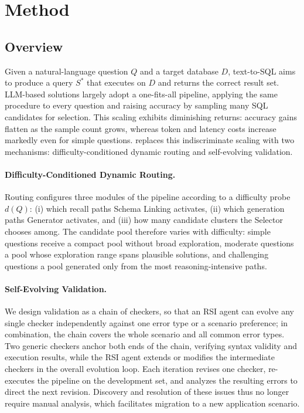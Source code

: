 \section{Method}
\label{sec:method}

\subsection{Overview}
\label{sec:overview}

Given a natural-language question $Q$ and a target database $D$, text-to-SQL aims
to produce a query $S^{*}$ that executes on $D$ and returns the correct result set.
LLM-based solutions largely adopt a one-fits-all pipeline, applying the same
procedure to every question and raising accuracy by sampling many SQL candidates for
selection. This scaling exhibits diminishing returns: accuracy gains flatten as the
sample count grows, whereas token and latency costs increase markedly even for simple
questions. \systemname{} replaces this indiscriminate scaling with two mechanisms:
difficulty-conditioned dynamic routing and self-evolving validation.

\paragraph{Difficulty-Conditioned Dynamic Routing.}
Routing configures three modules of the pipeline according to a difficulty probe
$d(Q)$: (i) which recall paths Schema Linking activates, (ii) which generation paths
Generator activates, and (iii) how many candidate clusters the Selector chooses among.
The candidate pool therefore varies with difficulty: simple questions receive a compact
pool without broad exploration, moderate questions a pool whose exploration range spans
plausible solutions, and challenging questions a pool generated only from the most
reasoning-intensive paths.

\paragraph{Self-Evolving Validation.}
We design validation as a chain of checkers, so that an RSI agent can evolve any single
checker independently against one error type or a scenario preference; in combination,
the chain covers the whole scenario and all common error types. Two generic checkers
anchor both ends of the chain, verifying syntax validity and execution results, while
the RSI agent extends or modifies the intermediate checkers in the overall evolution loop.
Each iteration revises one checker, re-executes the pipeline on the development set, and
analyzes the resulting errors to direct the next revision. Discovery and resolution of
these issues thus no longer require manual analysis, which facilitates migration to a new
application scenario.

